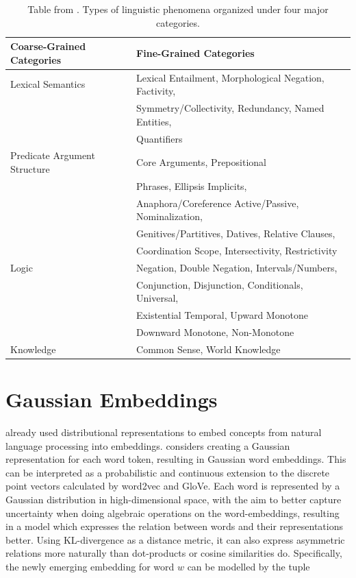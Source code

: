 \documentclass[a4paper,12pt,twoside,openright]{report}
\begin{document}
\begin{table}[h!]
\centering
\begin{tabular}{l l} 
 \hline
 Coarse-Grained Categories & Fine-Grained Categories \\ [0.5ex] 
 \hline
 Lexical Semantics & Lexical Entailment, Morphological Negation, Factivity, \\
&  Symmetry/Collectivity, Redundancy, Named Entities, \\
& Quantifiers \\ 
Predicate Argument Structure & Core Arguments, Prepositional \\ & Phrases, Ellipsis \/ Implicits, \\
& Anaphora/Coreference Active/Passive, Nominalization, \\
& Genitives/Partitives, Datives, Relative Clauses, \\
& Coordination Scope, Intersectivity, Restrictivity \\
Logic & Negation, Double Negation, Intervals/Numbers, \\
& Conjunction, Disjunction, Conditionals, Universal, \\
& Existential Temporal, Upward Monotone \\
& Downward Monotone, Non-Monotone \\
Knowledge & Common Sense, World Knowledge \\ [1ex] 
\hline
\end{tabular}
\caption{Table from \cite{wang19}. Types of linguistic phenomena organized under four major categories.}
\label{table:1}
\end{table}

\section{Gaussian Embeddings}\label{appendix:GaussianEmbeddings}

\cite{bengio06} already used distributional representations to embed concepts from natural language processing into embeddings.
\cite{vilnis14} considers creating a Gaussian representation for each word token, resulting in Gaussian word embeddings.
This can be interpreted as a probabilistic and continuous extension to the discrete point vectors calculated by word2vec and GloVe.
Each word is represented by a Gaussian distribution in high-dimensional space, with the aim to better capture uncertainty when doing algebraic operations on the word-embeddings, resulting in a model which expresses the relation between words and their representations better.
Using KL-divergence as a distance metric, it can also express asymmetric relations more naturally than dot-products or cosine similarities do.  
Specifically, the newly emerging embedding for word $w$ can be modelled by the tuple 
\end{document}

